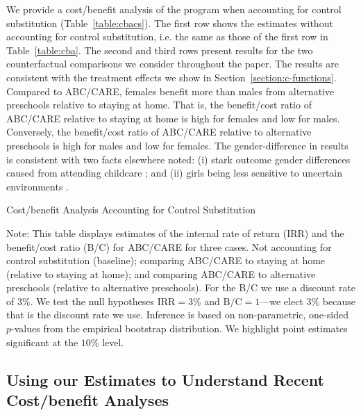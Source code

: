 We provide a cost/benefit analysis of the program when accounting for control substitution (Table~\ref{table:cbacs}). The first row shows the estimates without accounting for control substitution, i.e. the same as those of the first row in Table~\ref{table:cba}. The second and third rows present results for the two counterfactual comparisons we consider throughout the paper. The results are consistent with the treatment effects we show in Section~\ref{section:c-functions}. Compared to ABC/CARE, females benefit more than males from alternative preschools relative to staying at home. That is, the benefit/cost ratio of ABC/CARE relative to staying at home is high for females and low for males. Conversely, the benefit/cost ratio of ABC/CARE relative to alternative preschools is high for males and low for females. The gender-difference in results is consistent with two facts elsewhere noted: (i) stark outcome gender differences caused from attending childcare \citep{Kottelenberg-Lehrer_2014_Gender-Effects,Baker_Gruber_Milligan_2015_Noncog_Defects,Doyle-etal_2015_Econ-Hum-Bio,Doyle-etal_2016_PLoS-ONE}; and (ii) girls being less sensitive to uncertain environments \citep{Autor-etal_2015_Family-Disadvantage}.

\begin{table}[!htbp]
\begin{threeparttable}
\caption{Cost/benefit Analysis Accounting for Control Substitution}
\label{table:cbacs}
\centering

\begin{tablenotes}
\footnotesize
\item Note: This table displays estimates of the internal rate of return (IRR) and the benefit/cost ratio (B/C) for ABC/CARE for three cases. Not accounting for control substitution (baseline); comparing ABC/CARE to staying at home (relative to staying at home); and comparing ABC/CARE to alternative preschools (relative to alternative preschools). For the B/C we use a discount rate of $3\%$. We test the null hypotheses $\text{IRR} = 3\%$ and $\text{B/C} = 1$---we elect $3\%$ because that is the discount rate we use. Inference is based on non-parametric, one-sided $p$-values from the empirical bootstrap distribution. We highlight point estimates significant at the $10\%$ level.
\end{tablenotes}
\end{threeparttable}
\end{table}

\subsection{Using our Estimates to Understand Recent Cost/benefit Analyses}

